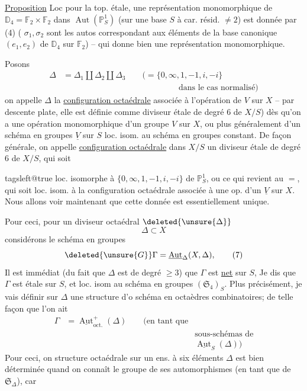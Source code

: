 \uline{Proposition} Loc pour la top. étale, une représentation monomorphique de \(\mathbb D_4=\mathbb F_2\times\mathbb F_2\) dans \(\operatorname{Aut}(\mathbb P^1_S)\) (sur une base \(S\) à car. résid. \(\ne2\)) est donnée par (4) ( \(\sigma_1,\sigma_2\) sont les autos correspondant aux éléments de la base canonique \((e_1,e_2)\) de \(\mathbb D_4\) sur \(\mathbb F_2\)) -- qui donne bien une représentation monomorphique.

Posons
\[
\begin{aligned}
\Delta&=\Delta_1\amalg\Delta_2\amalg\Delta_3\qquad\bigl(=\{0,\infty,1,-1,i,-i\}\\
&\hspace{14em}\text{dans le cas normalisé}\bigr)
\end{aligned} \tag*{(6)}
\]
on appelle \(\Delta\) la \uline{configuration octaédrale} associée à l'opération de \(V\) sur  \(X\) -- par descente plate, elle est définie comme diviseur étale de degré \(6\) de \(X/S\)) dès qu'on a une opération monomorphique  d'un groupe \(V\)  sur \(X\), ou plus généralement d'un schéma en groupes \(\underline V\) sur \(S\) loc. isom. au schéma en groupes constant.  De façon générale, on appelle \uline{configuration octaédrale} dans \(X/S\) un diviseur étale de degré \(6\) de \(X/S\), qui soit
\endgroup

\begingroup\csname tagsleft@true\endcsname
loc. isomorphe à \(\{0,\infty,1,-1,i,-i\}\) de \(\mathbb P^1_S\), ou ce qui revient au \(=\), qui soit loc. isom. à la configuration octaédrale associée à une op.  d'un \(\underline V\) sur \(X\). Nous allons voir maintenant que cette donnée est essentiellement unique.

Pour ceci, pour un diviseur octaédral \(\deleted{\unsure{\Delta}}\)
\[
\Delta\subset X
\]
considérons le schéma en groupes
\[
\deleted{\unsure{G}}\Gamma=\underline{\operatorname{Aut}}_{\Delta}(X,\Delta), \tag*{(7)}
\]
Il est immédiat (du fait que \(\Delta\) est de degré \(\geq3\)) que \(\Gamma\) est \uline{net} sur \(S\),  Je dis que \(\Gamma\) est étale sur \(S\), et loc. isom au schéma en groupes \((\mathfrak S_4)_S\). Plus précisément, je vais définir sur \(\Delta\)  une structure d'o schéma en octaèdres combinatoires; de telle façon que l'on ait
\[
\begin{aligned}
\Gamma&=\underline{\operatorname{Aut}}^{+}_{\mathrm{oct.}}(\Delta)
\qquad\bigl(\text{en tant que}\\
&&\text{sous-schémas de}\\
&&\underline{\operatorname{Aut}}_S(\Delta)\bigr)
\end{aligned} \tag*{(8)}
\]
Pour ceci, on   structure octaédrale sur un ens. à six éléments \(\Delta\) est bien déterminée quand on connaît le groupe de ses automorphismes  (en tant que  de \(\mathfrak S_{\Delta}\)), car
\endgroup

